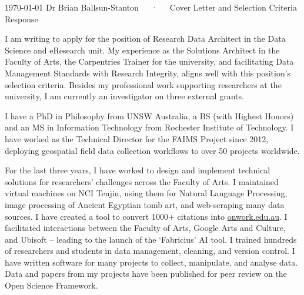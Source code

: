 \documentclass[11pt, a4paper]{awesome-cv}
\begin{document}
\makecvheader[C]

\makecvfooter
 {\today}
 {Dr Brian Ballsun-Stanton~~~·~~~Cover Letter and Selection Criteria Response}
 {\thepage}

\makelettertitle

\begin{cvletter}


I am writing to apply for the position of Research Data Architect in the Data Science and eResearch unit. My experience as the Solutions Architect in the Faculty of Arts, the Carpentries Trainer for the university, and facilitating Data Management Standards with Research Integrity, aligns well with this position's selection criteria. Besides my professional work supporting researchers at the university, I am currently an investigator on three external grants. 


I have a PhD in Philosophy from UNSW Australia, a BS (with Highest Honors) and an MS in Information Technology from Rochester Institute of Technology. I have worked as the Technical Director for the FAIMS Project since 2012, deploying geospatial field data collection workflows to over 50 projects worldwide. 

For the last three years, I have worked to design and implement technical solutions for researchers' challenges across the Faculty of Arts. I maintained virtual machines on NCI Tenjin, using them for Natural Language Processing, image processing of Ancient Egyptian tomb art, and web-scraping many data sources. I have created a tool to convert 1000+ citations into \href{https://onwork.edu.au}{onwork.edu.au}. I facilitated interactions between the Faculty of Arts, Google Arts and Culture, and Ubisoft -- leading to the launch of the `Fabricius' AI tool. I trained hundreds of researchers and students in data management, cleaning, and version control. I have written software for many projects to collect, manipulate, and analyse data. Data and papers from my projects have been published for peer review on the Open Science Framework. 



\end{cvletter}
\end{document}
